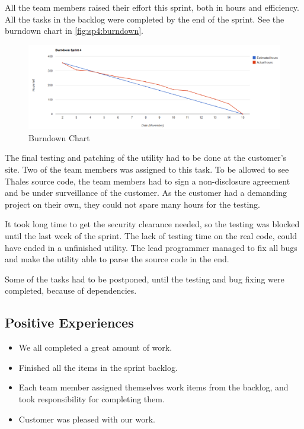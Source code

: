 All the team members raised their effort this sprint, both in hours and efficiency. All the tasks in the backlog were completed by the end of the sprint. See the burndown chart in \autoref{fig:sp4:burndown}.
\begin{figure}[!htb]
	\includegraphics[width=\textwidth]{./sprints/img/burndown_chart_s4}
	\caption{Burndown Chart\label{fig:sp4:burndown}}
\end{figure}

The final testing and patching of the utility had to be done at the customer's site. Two of the team members was assigned to this task. To be allowed to see Thales source code, the team members had to sign a non-disclosure agreement and be under surveillance of the customer. As the customer had a demanding project on their own, they could not spare many hours for the testing.

It took long time to get the security clearance needed, so the testing was blocked until the last week of the sprint. The lack of testing time on the real code, could have ended in a unfinished utility. The lead programmer managed to fix all bugs and make the utility able to parse the source code in the end.

Some of the tasks had to be postponed, until the testing and bug fixing were completed, because of dependencies. 

\subsection{Positive Experiences}
\begin{itemize}
	\item We all completed a great amount of work.
	\item Finished all the items in the sprint backlog.
	\item Each team member assigned themselves work items from the backlog, and took responsibility for completing them.
	\item Customer was pleased with our work.
\end{itemize}

